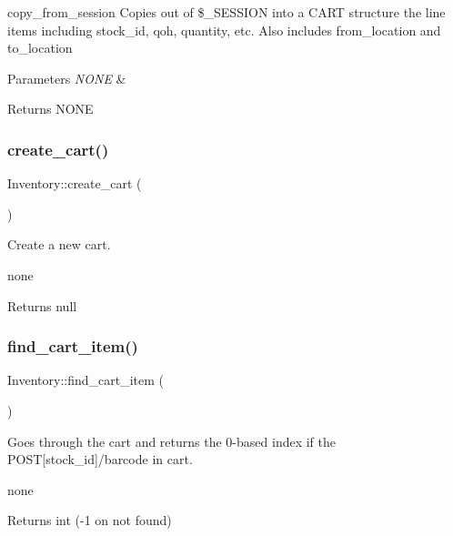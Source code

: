 copy\+\_\+from\+\_\+session Copies out of \$\+\_\+\+S\+E\+S\+S\+I\+ON into a C\+A\+RT structure the line items including stock\+\_\+id, qoh, quantity, etc. Also includes from\+\_\+location and to\+\_\+location


\begin{DoxyParams}{Parameters}
{\em N\+O\+NE} & \\
\hline
\end{DoxyParams}
\begin{DoxyReturn}{Returns}
N\+O\+NE 
\end{DoxyReturn}
\hypertarget{class_inventory_a6fb9d26bbc7d5385e77dd2fd01da307b}{}\label{class_inventory_a6fb9d26bbc7d5385e77dd2fd01da307b} 
\subsubsection{\texorpdfstring{create\+\_\+cart()}{create\_cart()}}
{\footnotesize\ttfamily Inventory\+::create\+\_\+cart (\begin{DoxyParamCaption}{ }\end{DoxyParamCaption})}

Create a new cart.

none \begin{DoxyReturn}{Returns}
null 
\end{DoxyReturn}
\hypertarget{class_inventory_a20a38a02a619c23ac051bef0f804b533}{}\label{class_inventory_a20a38a02a619c23ac051bef0f804b533} 
\subsubsection{\texorpdfstring{find\+\_\+cart\+\_\+item()}{find\_cart\_item()}}
{\footnotesize\ttfamily Inventory\+::find\+\_\+cart\+\_\+item (\begin{DoxyParamCaption}{ }\end{DoxyParamCaption})}

Goes through the cart and returns the 0-\/based index if the P\+O\+ST\mbox{[}\textquotesingle{}stock\+\_\+id\textquotesingle{}\mbox{]}/barcode in cart.

none \begin{DoxyReturn}{Returns}
int (-\/1 on not found) 
\end{DoxyReturn}
\hypertarget{class_inventory_ab93ab1de4e3622b63b07a3ec17bb5753}{}\label{class_inventory_ab93ab1de4e3622b63b07a3ec17bb5753} 
